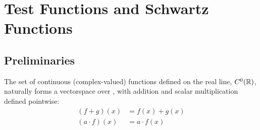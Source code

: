 \chapter{Test Functions and Schwartz Functions}
  
  \section{Preliminaries}

    The set of continuous (complex-valued) functions defined on the real line, $C^0(\mathbb{R})$, naturally forms a vectorspace over \R, with addition and scalar multiplication defined pointwise: 
    \begin{align*}
      (f+g)(x) &= f(x)+g(x)\\
      (a\cdot f)(x) &= a\cdot f(x)
    \end{align*}

